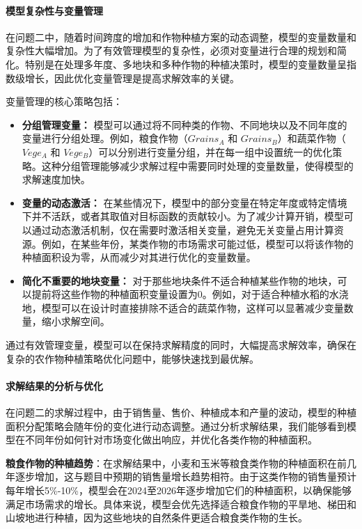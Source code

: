 \documentclass[12pt,a4paper]{nmmcm}
\begin{document}
\paragraph{模型复杂性与变量管理}

在问题二中，随着时间跨度的增加和作物种植方案的动态调整，模型的变量数量和复杂性大幅增加。为了有效管理模型的复杂性，必须对变量进行合理的规划和简化。特别是在处理多年度、多地块和多种作物的种植决策时，模型的变量数量呈指数级增长，因此优化变量管理是提高求解效率的关键。

变量管理的核心策略包括：

\begin{itemize}
  \item \textbf{分组管理变量：} 模型可以通过将不同种类的作物、不同地块以及不同年度的变量进行分组处理。例如，粮食作物（$Grains_A$ 和 $Grains_B$）和蔬菜作物（$Vege_A$ 和 $Vege_B$）可以分别进行变量分组，并在每一组中设置统一的优化策略。这种分组管理能够减少求解过程中需要同时处理的变量数量，使得模型的求解速度加快。

  \item \textbf{变量的动态激活：} 在某些情况下，模型中的部分变量在特定年度或特定情境下并不活跃，或者其取值对目标函数的贡献较小。为了减少计算开销，模型可以通过动态激活机制，仅在需要时激活相关变量，避免无关变量占用计算资源。例如，在某些年份，某类作物的市场需求可能过低，模型可以将该作物的种植面积设为零，从而减少对其进行优化的变量数量。

  \item \textbf{简化不重要的地块变量：} 对于那些地块条件不适合种植某些作物的地块，可以提前将这些作物的种植面积变量设置为0。例如，对于适合种植水稻的水浇地，模型可以在设计时直接排除不适合的蔬菜作物，这样可以显著减少变量数量，缩小求解空间。
\end{itemize}

通过有效管理变量，模型可以在保持求解精度的同时，大幅提高求解效率，确保在复杂的农作物种植策略优化问题中，能够快速找到最优解。

\paragraph{求解结果的分析与优化}

在问题二的求解过程中，由于销售量、售价、种植成本和产量的波动，模型的种植面积分配策略会随年份的变化进行动态调整。通过分析求解结果，我们能够看到模型在不同年份如何针对市场变化做出响应，并优化各类作物的种植面积。

\textbf{粮食作物的种植趋势}：在求解结果中，小麦和玉米等粮食类作物的种植面积在前几年逐步增加，这与题目中预期的销售量增长趋势相符。由于这类作物的销售量预计每年增长5\%-10\%，模型会在2024至2026年逐步增加它们的种植面积，以确保能够满足市场需求的增长。具体来说，模型会优先选择适合粮食作物的平旱地、梯田和山坡地进行种植，因为这些地块的自然条件更适合粮食类作物的生长。
\end{document}
